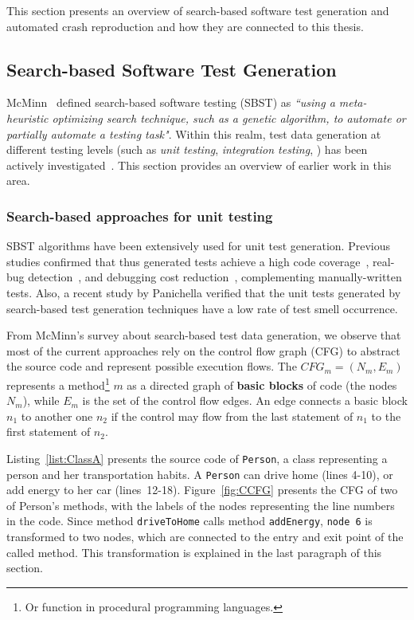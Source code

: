 This section presents an overview of search-based software test generation and automated crash reproduction and how they are connected to this thesis.

\subsection{Search-based Software Test Generation}
\label{sec:background:unit}
McMinn~\cite{McMinn2004} defined search-based software testing (SBST) as \textit{``using a meta-heuristic optimizing search technique, such as a genetic algorithm, to automate or partially automate a testing task"}.
Within this realm, test data generation at different testing levels (such as \textit{unit testing}, \textit{integration testing}, \etc) has been actively investigated~\cite{McMinn2004}. This section 
provides an overview of earlier work in this area.

\subsubsection{Search-based approaches for unit testing}
SBST algorithms have been extensively used for unit test generation. Previous studies confirmed that thus generated tests achieve a high code coverage~\cite{Panichella2018a, Campos2018}, real-bug detection~\cite{almasi2017industrial}, and debugging cost reduction~\cite{soltani2017, Panichella2016}, complementing manually-written tests. Also, a recent study by Panichella \etal \cite{panichella2020} verified that the unit tests generated by search-based test generation techniques have a low rate of test smell occurrence.

From McMinn's \cite{McMinn2004} survey about search-based test data generation, we observe that most of the current approaches rely on the control flow graph (CFG) to abstract the source code and represent possible execution flows. The $CFG_m=(N_m,E_m)$ represents a method\footnote{Or function in procedural programming languages.} $m$ as a directed graph of \textbf{basic blocks} of code (the nodes $N_m$), while $E_m$ is the set of the control flow edges. An edge connects a basic block $n_1$ to another one $n_2$ if the control may flow from the last statement of $n_1$ to the first statement of $n_2$. 

Listing~\ref{list:ClassA} presents the source code of \texttt{Person}, a class representing a person and her transportation habits. A \texttt{Person} can drive home (lines 4-10), or add energy to her car (lines~12-18). Figure~\ref{fig:CCFG} presents the CFG of two of Person's methods, with the labels of the nodes representing the line numbers in the code. Since method \texttt{driveToHome} calls method \texttt{addEnergy}, \texttt{node 6} is transformed to two nodes, which are connected to the entry and exit point of the called method. This transformation is explained in the last paragraph of this section.  

